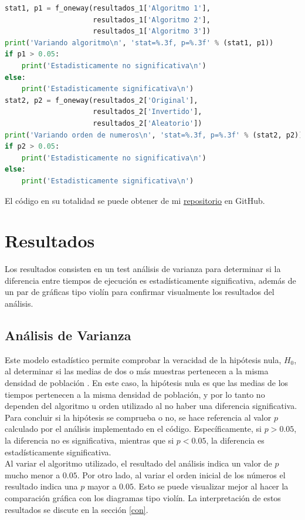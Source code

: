 \documentclass{article}
\begin{document}
\begin{lstlisting}[caption=Test de an\'alisis de varianza, label=codigo4, language=Python]
stat1, p1 = f_oneway(resultados_1['Algoritmo 1'],
                     resultados_1['Algoritmo 2'],
                     resultados_1['Algoritmo 3'])
print('Variando algoritmo\n', 'stat=%.3f, p=%.3f' % (stat1, p1))
if p1 > 0.05:
    print('Estadisticamente no significativa\n')
else:
    print('Estadisticamente significativa\n')
stat2, p2 = f_oneway(resultados_2['Original'],
                     resultados_2['Invertido'],
                     resultados_2['Aleatorio'])
print('Variando orden de numeros\n', 'stat=%.3f, p=%.3f' % (stat2, p2))
if p2 > 0.05:
    print('Estadisticamente no significativa\n')
else:
    print('Estadisticamente significativa\n')
\end{lstlisting}
El c\'odigo en su totalidad se puede obtener de mi \href{https://github.com/FeroxDeitas/Simulacion-Nano/blob/main/Tareas/P3/teoria_colas.py}{repositorio} en GitHub.

\section{Resultados}\label{res}
Los resultados consisten en un test an\'alisis de varianza para determinar si la diferencia entre tiempos de ejecuci\'on es estad\'isticamente significativa, adem\'as de un par de gr\'aficas tipo viol\'in para confirmar visualmente los resultados del an\'alisis.

\subsection{An\'alisis de Varianza}\label{var}
Este modelo estad\'istico permite comprobar la veracidad de la hip\'otesis nula, $H_0$, al determinar si las medias de  dos o m\'as  muestras pertenecen a la misma densidad de poblaci\'on \cite{wiki1}. En este caso, la hip\'otesis nula es que las medias de los tiempos pertenecen a la misma densidad de poblaci\'on, y por lo tanto no dependen del algoritmo u orden utilizado al no haber una diferencia significativa. Para concluir si la hip\'otesis se comprueba o no, se hace referencia al valor $p$ calculado por el an\'alisis implementado en el c\'odigo. Espec\'ificamente, si $p>0.05$, la diferencia no es significativa, mientras que si $p<0.05$, la diferencia es estad\'isticamente significativa.\\

Al variar el algoritmo utilizado, el resultado del an\'alisis indica un valor de $p$ mucho menor a $0.05$. Por otro lado, al variar el orden inicial de los n\'umeros el resultado indica una $p$ mayor a $0.05$. Esto se puede visualizar mejor al hacer la comparaci\'on gr\'afica con los diagramas tipo viol\'in. La interpretaci\'on de estos resultados se discute en la secci\'on \ref{con}.
\end{document}
